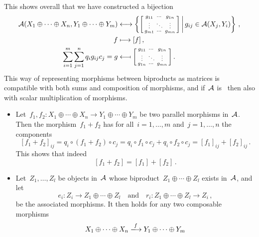 \begin{remark*}
  This shows overall that we have constructed a bijection
  \begin{align*}
      \Acat(X_1 \oplus \dotsb \oplus X_n, Y_1 \oplus \dotsb \oplus Y_m)
    &\longleftrightarrow
      \left\{
        \begin{bsmallmatrix}
          g_{11}  & \cdots  & g_{1n}  \\
          \vdots  & \ddots  & \vdots  \\
          g_{m1}  & \cdots  & g_{mn}
        \end{bsmallmatrix}
      \suchthat*
        g_{ij} \in \Acat(X_j, Y_i)
      \right\}  \,,
    \\
      f
    &\longmapsto
      [f] \,,
    \\
      \sum_{i=1}^m \sum_{j=1}^n q_i g_{ij} c_j
    =
      g
    &\longmapsfrom
      \begin{bsmallmatrix}
          g_{11}  & \cdots  & g_{1n}  \\
          \vdots  & \ddots  & \vdots  \\
          g_{1n}  & \cdots  & g_{mn}
        \end{bsmallmatrix}  \,.
  \end{align*}
  This way of representing morphisms between biproducts as matrices is compatible with both sums and composition of morphisms, and if~$\mathcal{A}$ is~{\preklin} then also with scalar multiplication of morphisms.
  \begin{itemize}
    \item
      Let~$f_1, f_2 \colon X_1 \oplus \dotsb \oplus X_n \to Y_1 \oplus \dotsb \oplus Y_m$ be two parallel morphisms in~$\mathcal{A}$.
      Then the morphism~$f_1 + f_2$ has for all~$i = 1, \dotsc, m$ and~$j = 1, \dotsc, n$ the components
      \[
          [f_1 + f_2]_{ij}
        = q_i \circ (f_1 + f_2) \circ c_j
        = q_i \circ f_1 \circ c_j + q_i \circ f_2 \circ c_j
        = [f_1]_{ij} + [f_2]_{ij} \,.
      \]
      This shows that indeed
      \[
          [f_1 + f_2]
        = [f_1] + [f_2] \,.
      \]
    \item
      Let~$Z_1, \dotsc, Z_l$ be objects in~$\mathcal{A}$ whose biproduct~$Z_1 \oplus \dotsb \oplus Z_l$ exists in~$\mathcal{A}$, and let
      \[
        e_i \colon Z_i \to Z_1 \oplus \dotsb \oplus Z_l
      \quad\text{and}\quad
        r_i \colon Z_1 \oplus \dotsb \oplus Z_l \to Z_i \,,
      \]
      be the associated morphisms.
      It then holds for any two composable morphisms
      \[
          X_1 \oplus \dotsb \oplus X_n
        \xlongto{f}
          Y_1 \oplus \dotsb \oplus Y_m
\]
\end{itemize}
\end{remark*}
